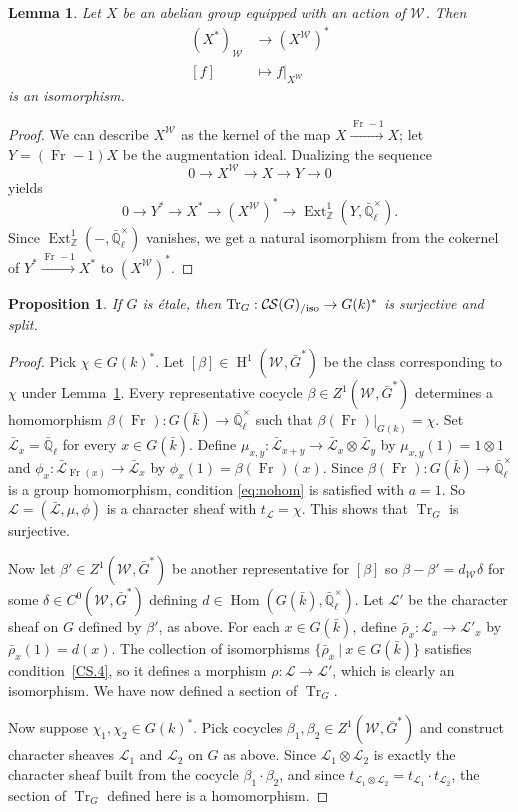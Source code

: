\documentclass[10pt]{amsart}
\theoremstyle{plain}
\newtheorem{proposition}[theorem]{Proposition}
\newtheorem{lemma}[theorem]{Lemma}
\theoremstyle{definition}
\newcommand{\ZZ}{{\mathbb{Z}}}
\newcommand{\EE}{\mathbb{\bar Q}_\ell}
\newcommand{\bFq}{\bar{k}}
\newcommand{\Fq}{k}
\newcommand{\EEx}{\EE^\times}
\newcommand{\Weil}[1]{\mathcal{W}_{#1}}
\newcommand{\Frob}[1]{\operatorname{Fr}_{#1}}
\DeclareMathOperator{\Hom}{Hom}
\DeclareMathOperator{\Ext}{Ext}
\DeclareMathOperator{\Hh}{H}
\newcommand{\tq}{{\ \vert\ }}
\newcommand{\trFrob}[1]{t_{#1}}
\newcommand{\TrFrob}[1]{\operatorname{Tr}_{#1}}
\newcommand{\cs}[1]{{\mathcal{#1}}}
\newcommand{\gcs}[1]{{\mathcal{\bar #1}}}
\newcommand{\CS}{{\mathcal{C\hskip-0.8pt S}}}
\newcommand{\CSiso}[1]{\CS(#1)_{/\text{iso}}}
\newcommand{\bG}{\bar{G}}
\newcommand{\brho}{{\bar\rho}}
\begin{document}
\begin{lemma} \label{lem:dual-inv}
Let $X$ be an abelian group equipped with an action of $\Weil{}$.  Then
\begin{align*}
 (X^*)_{\Weil{}} &\to (X^{\Weil{}})^* \\
 [f] &\mapsto f|_{X^{\Weil{}}}
\end{align*}
is an isomorphism.
\end{lemma}

\begin{proof}
We can describe $X^{\Weil{}}$ as the kernel of the map $X \xrightarrow{\Frob{}-1} X$;
let $Y = (\Frob{}-1)X$ be the augmentation ideal.  Dualizing the sequence
\[
 0 \to X^{\Weil{}} \to X \to Y \to 0
\]
yields
\[
 0 \to Y^* \to X^* \to (X^{\Weil{}})^* \to \Ext^1_\ZZ(Y, \EEx).
\]
Since $\Ext^1_\ZZ(-,\EEx)$ vanishes, we get a natural isomorphism from the cokernel of $Y^* \xrightarrow{\Frob{}-1} X^*$ to $(X^{\Weil{}})^*$.
\end{proof}

\begin{proposition}\label{prop:sur_etale}
If $G$ is \'etale, then $\TrFrob{G} : \CSiso{G} \to G(\Fq)^*$ is surjective
and split.
\end{proposition}
\begin{proof}
Pick $\chi \in G(\Fq)^*$. 
Let $[\beta]\in \Hh^1(\Weil{},\bG^*)$ be the class corresponding to $\chi$ under Lemma~\ref{lem:dual-inv}.
Every representative cocycle $\beta \in Z^1(\Weil{},\bG^*)$ determines a homomorphism
$\beta(\Frob{}) : G(\bFq)\to \EEx$ such that $\beta(\Frob{})\vert_{G(\Fq)} = \chi$.
Set $\gcs{L}_x = \EE$ for every $x\in G(\bFq)$.
Define $\mu_{x,y} : \gcs{L}_{x+y} \to \gcs{L}_x\otimes \gcs{L}_y$ by $\mu_{x,y}(1) = 1 \otimes 1$ and
$\phi_{x} : \gcs{L}_{\Frob{}(x)} \to \gcs{L}_x$ by $\phi_{x}(1) = \beta(\Frob{})(x)$.
Since $\beta(\Frob{}) : G(\bFq) \to \EEx$ is a group homomorphism,
condition \eqref{eq:nohom} is satisfied with $a =1$.
So $\cs{L} = (\gcs{L}, \mu, \phi)$
is a character sheaf with $\trFrob{\cs{L}} = \chi$.
This shows that $\TrFrob{G}$ is surjective.

Now let $\beta' \in Z^1(\Weil{},\bG^*)$ be another representative for $[\beta]$
so $\beta-\beta' = d_{\Weil{}} \delta$ for some $\delta \in C^0(\Weil{},\bG^*)$ defining $d \in \Hom(G(\bFq),\EEx)$.
Let $\cs{L}'$ be the character sheaf on $G$ defined by $\beta'$, as above.
For each $x\in G(\bFq)$, define $\brho_x :\cs{L}_x\to \cs{L}'_x$ by $\brho_x(1) = d(x)$.
The collection of isomorphisms $\{ \brho_x \tq x\in G(\bFq)\}$ satisfies condition~\ref{CS.4},
so it defines a morphism $\rho : \cs{L}\to \cs{L}'$, which is clearly an isomorphism. 
%
We have now defined a section of $\TrFrob{G}$. 

Now suppose $\chi_1, \chi_2 \in G(\Fq)^*$. Pick cocycles $\beta_1,\beta_2\in Z^1(\Weil{},\bG^*)$ and
construct character sheaves $\cs{L}_1$ and $\cs{L}_2$ on $G$ as above. Since $\cs{L}_1\otimes \cs{L}_2$
is exactly the character sheaf built from the cocycle $\beta_1\cdot \beta_2$, and since
$\trFrob{\cs{L}_1\otimes \cs{L}_2} = \trFrob{\cs{L}_1}\cdot \trFrob{\cs{L}_2}$, the section of $\TrFrob{G}$ defined here is a homomorphism.
\end{proof}
\end{document}
